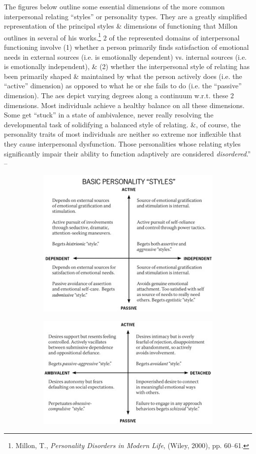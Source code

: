 \documentclass{article}
\numberwithin{equation}{section}
\begin{document}
The figures below outline some essential dimensions of the more common interpersonal relating ``styles'' or personality types. They are a greatly simplified representation of the principal styles \& dimensions of functioning that Millon outlines in several of his works.\footnote{Millon, T., \textit{Personality Disorders in Modern Life}, (Wiley, 2000), pp. 60--61.} 2 of the represented domains of interpersonal functioning involve (1) whether a person primarily finds satisfaction of emotional needs in external sources (i.e. is emotionally dependent) vs. internal sources (i.e. is emotionally independent), \& (2) whether the interpersonal style of relating has been primarily shaped \& maintained by what the person actively does (i.e. the ``active'' dimension) as opposed to what he or she fails to do (i.e. the ``passive'' dimension). The aes depict varying degrees along a continuum w.r.t. these 2 dimensions. Most individuals achieve a healthy balance on all these dimensions. Some get ``stuck'' in a state of ambivalence, never really resolving the developmental task of solidifying a balanced style of relating. \&, of course, the personality traits of most individuals are neither so extreme nor inflexible that they cause interpersonal dysfunction. Those personalities whose relating styles significantly impair their ability to function adaptively are considered \textit{disordered}.'' -- \cite[pp. 54--56]{Simon2011}
\begin{figure}[H]
	\centering
	\begin{subfigure}[b]{0.49\textwidth}
		\centering
		\includegraphics[scale=0.55]{Simon2011_3}
	\end{subfigure}
	\begin{subfigure}[b]{0.49\textwidth}
		\centering
		\includegraphics[scale=0.55]{Simon2011_4}
	\end{subfigure}
\end{figure}
\end{document}
